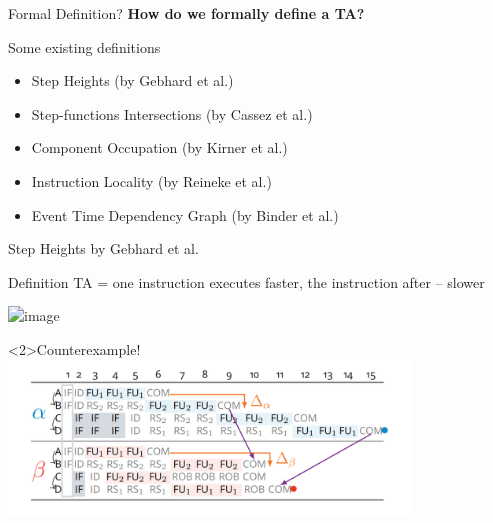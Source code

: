 \documentclass{beamer}
\begin{document}
\begin{frame}{Formal Definition?}
    \textbf{How do we formally define a TA?}

    \begin{block}{Some existing definitions}
        \begin{itemize}
            \item Step Heights (by Gebhard et al.)
            \item Step-functions Intersections (by Cassez et al.)
            \item Component Occupation (by Kirner et al.)
            \item Instruction Locality (by Reineke et al.)
            \item Event Time Dependency Graph (by Binder et al.)
        \end{itemize}
    \end{block}
\end{frame}


\begin{frame}{Step Heights by Gebhard et al.}
    \begin{block}{Definition}
        TA = one instruction executes faster, the instruction after -- slower
    \end{block}

    \includegraphics<1>[width=\textwidth]{pic/step-height-good.png}

    \begin{alertblock}<2>{Counterexample!}
        \includegraphics[width=0.8\textwidth]{pic/step-height-bad.png}
    \end{alertblock}
\end{frame}
\end{document}
